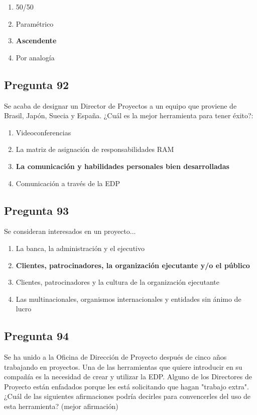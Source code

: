 \documentclass[11pt,a4paper]{article}
\begin{document}
\begin{enumerate}[label=\alph*)]
  \item 50/50
  \item Paramétrico
  \item \textbf{Ascendente}
  \item Por analogía
\end{enumerate}

\subsection*{Pregunta 92}
Se acaba de designar un Director de Proyectos a un equipo que proviene de Brasil, Japón, Suecia y España. ¿Cuál es la mejor herramienta para tener éxito?:

\begin{enumerate}[label=\alph*)]
  \item Videoconferencias
  \item La matriz de asignación de responsabilidades RAM
  \item \textbf{La comunicación y habilidades personales bien desarrolladas}
  \item Comunicación a través de la EDP
\end{enumerate}

\subsection*{Pregunta 93}
Se consideran interesados en un proyecto...

\begin{enumerate}[label=\alph*)]
  \item La banca, la administración y el ejecutivo
  \item \textbf{Clientes, patrocinadores, la organización ejecutante y/o el público}
  \item Clientes, patrocinadores y la cultura de la organización ejecutante
  \item Las multinacionales, organismos internacionales y entidades sin ánimo de lucro
\end{enumerate}

\subsection*{Pregunta 94}
Se ha unido a la Oficina de Dirección de Proyecto después de cinco años trabajando en proyectos. Una de las herramientas que quiere introducir en su compañía es la necesidad de crear y utilizar la EDP. Alguno de los Directores de Proyecto están enfadados porque les está solicitando que hagan "trabajo extra". ¿Cuál de las siguientes afirmaciones podría decirles para convencerles del uso de esta herramienta? (mejor afirmación)
\end{document}
